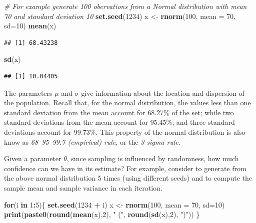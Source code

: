 \documentclass[
]{article}
\newenvironment{Shaded}{\begin{snugshade}}{\end{snugshade}}
\newcommand{\AttributeTok}[1]{\textcolor[rgb]{0.13,0.29,0.53}{#1}}
\newcommand{\CommentTok}[1]{\textcolor[rgb]{0.56,0.35,0.01}{\textit{#1}}}
\newcommand{\ControlFlowTok}[1]{\textcolor[rgb]{0.13,0.29,0.53}{\textbf{#1}}}
\newcommand{\DecValTok}[1]{\textcolor[rgb]{0.00,0.00,0.81}{#1}}
\newcommand{\FunctionTok}[1]{\textcolor[rgb]{0.13,0.29,0.53}{\textbf{#1}}}
\newcommand{\NormalTok}[1]{#1}
\newcommand{\OtherTok}[1]{\textcolor[rgb]{0.56,0.35,0.01}{#1}}
\newcommand{\SpecialCharTok}[1]{\textcolor[rgb]{0.81,0.36,0.00}{\textbf{#1}}}
\newcommand{\StringTok}[1]{\textcolor[rgb]{0.31,0.60,0.02}{#1}}
\begin{document}
\begin{Shaded}
\begin{Highlighting}[]
\CommentTok{\# For example generate 100 obervations from a Normal distribution with mean 70 and standard deviation 10}
\FunctionTok{set.seed}\NormalTok{(}\DecValTok{1234}\NormalTok{)}
\NormalTok{x }\OtherTok{\textless{}{-}} \FunctionTok{rnorm}\NormalTok{(}\DecValTok{100}\NormalTok{, }\AttributeTok{mean =} \DecValTok{70}\NormalTok{, }\AttributeTok{sd=}\DecValTok{10}\NormalTok{)}
\FunctionTok{mean}\NormalTok{(x)}
\end{Highlighting}
\end{Shaded}

\begin{verbatim}
## [1] 68.43238
\end{verbatim}

\begin{Shaded}
\begin{Highlighting}[]
\FunctionTok{sd}\NormalTok{(x)}
\end{Highlighting}
\end{Shaded}

\begin{verbatim}
## [1] 10.04405
\end{verbatim}

The parameters \(\mu\) and \(\sigma\) give information about the
location and dispersion of the population. Recall that, for the normal
distribution, the values less than one standard deviation from the mean
account for 68.27\% of the set; while two standard deviations from the
mean account for 95.45\%; and three standard deviations account for
99.73\%. This property of the normal distribution is also know as
\emph{68--95--99.7 (empirical) rule}, or the \emph{3-sigma rule}.

Given a parameter \(\theta\), since sampling is influenced by
randomness, how much confidence can we have in its estimate? For
example, consider to generate from the above normal distribution 5 times
(using different seeds) and to compute the sample mean and sample
variance in each iteration.

\begin{Shaded}
\begin{Highlighting}[]
\ControlFlowTok{for}\NormalTok{(i }\ControlFlowTok{in} \DecValTok{1}\SpecialCharTok{:}\DecValTok{5}\NormalTok{)\{}
  \FunctionTok{set.seed}\NormalTok{(}\DecValTok{1234} \SpecialCharTok{+}\NormalTok{ i)}
\NormalTok{  x }\OtherTok{\textless{}{-}} \FunctionTok{rnorm}\NormalTok{(}\DecValTok{100}\NormalTok{, }\AttributeTok{mean =} \DecValTok{70}\NormalTok{, }\AttributeTok{sd=}\DecValTok{10}\NormalTok{)}
  \FunctionTok{print}\NormalTok{(}\FunctionTok{paste0}\NormalTok{(}\FunctionTok{round}\NormalTok{(}\FunctionTok{mean}\NormalTok{(x),}\DecValTok{2}\NormalTok{), }\StringTok{" ("}\NormalTok{, }\FunctionTok{round}\NormalTok{(}\FunctionTok{sd}\NormalTok{(x),}\DecValTok{2}\NormalTok{), }\StringTok{")"}\NormalTok{))}
\NormalTok{\}}
\end{Highlighting}
\end{Shaded}
\end{document}
